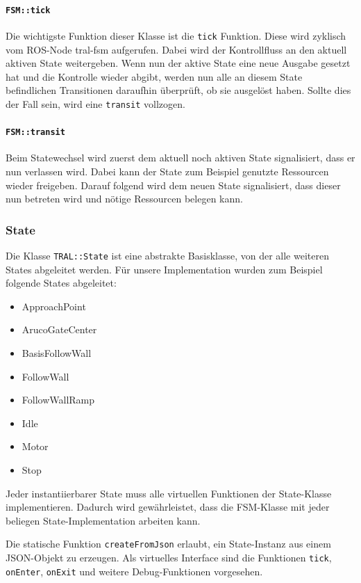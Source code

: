 \paragraph{\texttt{FSM::tick}}

Die wichtigste Funktion dieser Klasse ist die \texttt{tick} Funktion. Diese wird zyklisch vom ROS-Node tral-fsm aufgerufen. Dabei wird der Kontrollfluss an den aktuell aktiven State weitergeben. Wenn nun der aktive State eine neue Ausgabe gesetzt hat und die Kontrolle wieder abgibt, werden nun alle an diesem State befindlichen Transitionen daraufhin überprüft, ob sie ausgelöst haben. Sollte dies der Fall sein, wird eine \texttt{transit} vollzogen.

\paragraph{\texttt{FSM::transit}}

Beim Statewechsel wird zuerst dem aktuell noch aktiven State signalisiert, dass er nun verlassen wird. Dabei kann der State zum Beispiel genutzte Ressourcen wieder freigeben. Darauf folgend wird dem neuen State signalisiert, dass dieser nun betreten wird und nötige Ressourcen belegen kann.


\subsubsection{State}
Die Klasse \texttt{TRAL::State} ist eine abstrakte Basisklasse, von der alle weiteren States abgeleitet werden. Für unsere Implementation wurden zum Beispiel folgende States abgeleitet:

\begin{itemize}
	\item ApproachPoint
	\item ArucoGateCenter
	\item BasisFollowWall
	\item FollowWall
	\item FollowWallRamp
	\item Idle
	\item Motor
	\item Stop
\end{itemize}

Jeder instantiierbarer State muss alle virtuellen Funktionen der State-Klasse implementieren. Dadurch wird gewährleistet, dass die FSM-Klasse mit jeder beliegen State-Implementation arbeiten kann.

Die statische Funktion \texttt{createFromJson} erlaubt, ein State-Instanz aus einem JSON-Objekt zu erzeugen. Als virtuelles Interface sind die Funktionen \texttt{tick}, \texttt{onEnter}, \texttt{onExit} und weitere Debug-Funktionen vorgesehen.

